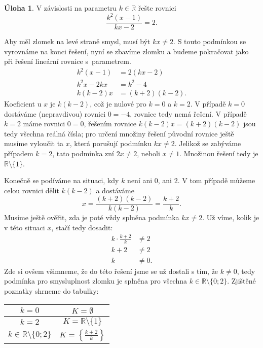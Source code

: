 \documentclass[12pt,a4paper]{article}
\newcommand{\R}{\mathbb{R}}
\theoremstyle{definition}
\newtheorem{uloha}{Úloha}
\newenvironment{res}{\proof}{\endproof}
\begin{document}
\begin{uloha}
V závislosti na parametru $k \in \R$ řešte rovnici
\[ \frac{k^2(x-1)}{kx - 2} = 2. \]
\end{uloha}
\begin{res}
Aby měl zlomek na levé straně smysl, musí být $kx \neq 2$. S touto podmínkou se vyrovnáme na konci řešení, nyní se zbavíme zlomku a budeme pokračovat jako při řešení  lineární rovnice s~parametrem.
\begin{align*}
k^2(x-1) &= 2(kx - 2) \\
k^2 x - 2kx &= k^2 - 4 \\
k(k-2)x &= (k+2)(k-2).
\end{align*}
Koeficient u $x$ je $k(k-2)$, což je nulové pro $k = 0$ a $k = 2$. V případě $k = 0$ dostáváme (nepravdivou) rovnici $0 = -4$, rovnice tedy nemá řešení. V případě $k = 2$ máme rovnici $0 = 0$, řešením rovnice $k(k-2)x = (k+2)(k-2)$ jsou tedy všechna reálná čísla; pro určení množiny řešení původní rovnice ještě musíme vyloučit ta $x$, která porušují podmínku $kx \neq 2$. Jelikož se zabýváme případem $k = 2$, tato podmínka zní $2x \neq 2$, neboli $x \neq 1$. Množinou řešení tedy je $\R \setminus \{1\}$.

Konečně se podíváme na situaci, kdy $k$ není ani $0$, ani $2$. V tom případě můžeme celou rovnici dělit $k(k-2)$ a dostáváme
\[ x = \frac{(k+2)(k-2)}{k(k-2)} = \frac{k+2}{k}. \]
Musíme ještě ověřit, zda je poté vždy splněna podmínka $kx \neq 2$. Už víme, kolik je v této situaci $x$, stačí tedy dosadit:
\begin{align*}
k \cdot \frac{k+2}{k} &\neq 2 \\
k + 2 &\neq 2 \\
k &\neq 0.
\end{align*}
Zde si ovšem všimneme, že do této  řešení jsme se už dostali s tím, že $k \neq 0$, tedy podmínka pro smysluplnost zlomku je splněna pro všechna $k \in \R \setminus \{0; 2\}$. Zjištěné poznatky shrneme do tabulky:
\begin{center}
\begin{tabular}{c|c}
$k = 0$ & $K = \emptyset$ \\ \hline
$k = 2$ & $K = \R \setminus \{1\}$ \\ \hline
$k \in \R \setminus \{0;2\}$ & $K = \left\{\frac{k+2}k\right\}$
\end{tabular}
\end{center}
\end{res}
\end{document}
